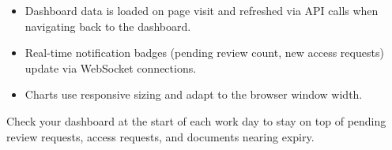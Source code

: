 \begin{itemize}[leftmargin=18pt]
  \item Dashboard data is loaded on page visit and refreshed
        via API calls when navigating back to the dashboard.
  \item Real-time notification badges (pending review count,
        new access requests) update via WebSocket connections.
  \item Charts use responsive sizing and adapt to the browser
        window width.
\end{itemize}

\begin{ugTip}
  Check your dashboard at the start of each work day to stay
  on top of pending review requests, access requests, and
  documents nearing expiry.
\end{ugTip}

\newpage
